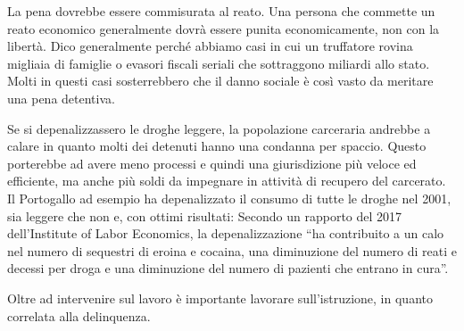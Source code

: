 \documentclass[12pt]{book} %
\begin{document}
La pena dovrebbe essere commisurata al reato. Una persona
che commette un reato economico generalmente dovrà essere punita economicamente, non con la libertà.
Dico generalmente perché abbiamo casi in cui un truffatore rovina migliaia di famiglie o evasori fiscali seriali che sottraggono miliardi allo stato. Molti in questi casi sosterrebbero che il danno sociale è così vasto da meritare una pena detentiva.

Se si depenalizzassero le droghe leggere, la popolazione carceraria andrebbe a calare in quanto molti dei detenuti
hanno una condanna per spaccio. Questo porterebbe ad avere meno processi e quindi una giurisdizione più veloce ed efficiente,
ma anche più soldi da impegnare in attività di recupero del carcerato. Il Portogallo ad esempio ha depenalizzato il
consumo di tutte le droghe nel 2001, sia leggere che non e, con ottimi risultati: Secondo un rapporto del 2017
dell'Institute of Labor
Economics, la depenalizzazione “ha contribuito a un calo nel numero di sequestri di eroina e cocaina, una diminuzione del
numero di reati e decessi per droga e una diminuzione del numero di pazienti che entrano in cura”. 

Oltre ad intervenire sul lavoro è importante lavorare sull'istruzione, in quanto correlata alla delinquenza.
\end{document}
